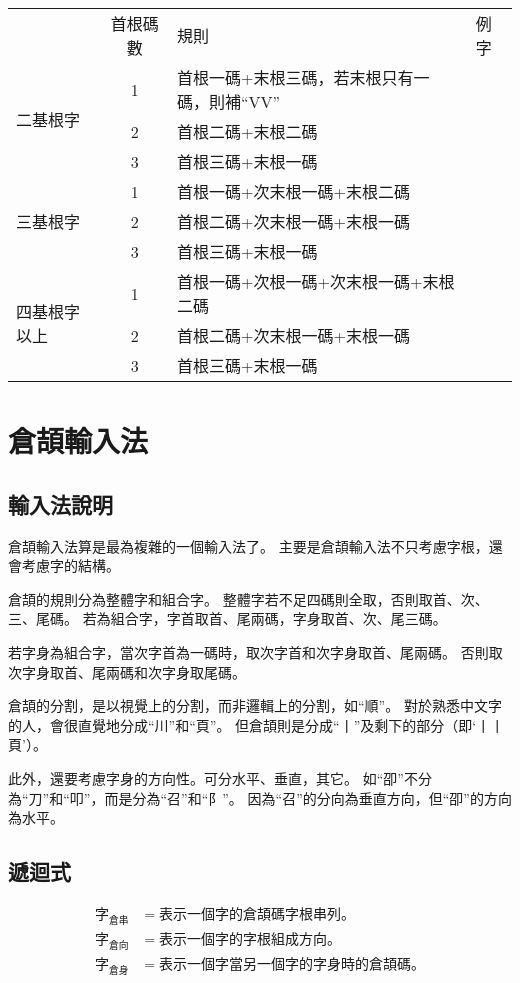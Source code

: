 \documentclass{article}
\newcommand\qhchar[1]{\mbox{#1}}
\newcommand\qhcjlist[1]{\qhchar{#1}_{\mbox{倉串}}}
\newcommand\qhcjdir[1]{\qhchar{#1}_{\mbox{倉向}}}
\newcommand\qhcjbody[1]{\qhchar{#1}_{\mbox{倉身}}}
\begin{document}
\begin{tabular}{lcll}
           & 首根碼數 & 規則 & 例字\\
  \multirow{3}{*}{二基根字} & 1 & 首根一碼+末根三碼，若末根只有一碼，則補``VV''\\
  & 2 & 首根二碼+末根二碼\\
  & 3 & 首根三碼+末根一碼\\
  \multirow{3}{*}{三基根字} & 1 & 首根一碼+次末根一碼+末根二碼\\
  & 2 & 首根二碼+次末根一碼+末根一碼\\
  & 3 & 首根三碼+末根一碼\\
  \multirow{4}{*}{四基根字以上} & 1 & 首根一碼+次根一碼+次末根一碼+末根二碼\\
  & 2 & 首根二碼+次末根一碼+末根一碼\\
  & 3 & 首根三碼+末根一碼\\
\end{tabular}

\section{倉頡輸入法}
\subsection{輸入法說明}
倉頡輸入法算是最為複雜的一個輸入法了。
主要是倉頡輸入法不只考慮字根，還會考慮字的結構。

倉頡的規則分為整體字和組合字。
整體字若不足四碼則全取，否則取首、次、三、尾碼。
若為組合字，字首取首、尾兩碼，字身取首、次、尾三碼。

若字身為組合字，當次字首為一碼時，取次字首和次字身取首、尾兩碼。
否則取次字身取首、尾兩碼和次字身取尾碼。

倉頡的分割，是以視覺上的分割，而非邏輯上的分割，如``順''。
對於熟悉中文字的人，會很直覺地分成``川''和``頁''。
但倉頡則是分成``丨''及剩下的部分（即`丨丨頁'）。

此外，還要考慮字身的方向性。可分水平、垂直，其它。
如``卲''不分為``刀''和``叩''，而是分為``召''和``阝''。
因為``召''的分向為垂直方向，但``卲''的方向為水平。

\subsection{遞迴式}
\begin{subequations}
  \begin{align}
    \qhcjlist{字} &= 表示一個字的倉頡碼字根串列。\\
    \qhcjdir{字} &= 表示一個字的字根組成方向。\\
    \qhcjbody{字} &= 表示一個字當另一個字的字身時的倉頡碼。\\
  \end{align}
\end{subequations}
\end{document}
